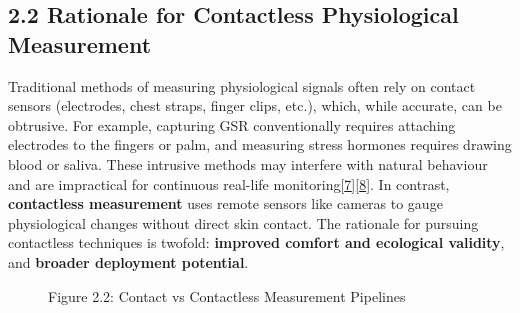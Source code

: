 \documentclass[12pt,a4paper]{article}
\begin{document}
\subsection{2.2 Rationale for Contactless Physiological Measurement}\label{rationale-for-contactless-physiological-measurement}

Traditional methods of measuring physiological signals often rely on contact sensors (electrodes, chest straps, finger clips, etc.), which, while accurate, can be obtrusive. For example, capturing GSR conventionally requires attaching electrodes to the fingers or palm, and measuring stress hormones requires drawing blood or saliva. These intrusive methods may interfere with natural behaviour and are impractical for continuous real-life monitoring\href{https://www.frontiersin.org/journals/computer-science/articles/10.3389/fcomp.2020.00039/full\#:~:text=provide\%20people\%20with\%20a\%20means,the\%20basis\%20for\%20such\%20support}{{[}7{]}}\href{https://pmc.ncbi.nlm.nih.gov/articles/PMC10385045/\#:~:text=Numerous\%20studies\%20have\%20investigated\%20the,natural\%20physiological\%20responses\%20under\%20study}{{[}8{]}}. In contrast, \textbf{contactless measurement} uses remote sensors like cameras to gauge physiological changes without direct skin contact. The rationale for pursuing contactless techniques is twofold: \textbf{improved comfort and ecological validity}, and \textbf{broader deployment potential}.

\begin{figure}
\centering
{}
\caption{Figure 2.2: Contact vs Contactless Measurement Pipelines}
\end{figure}
\end{document}
